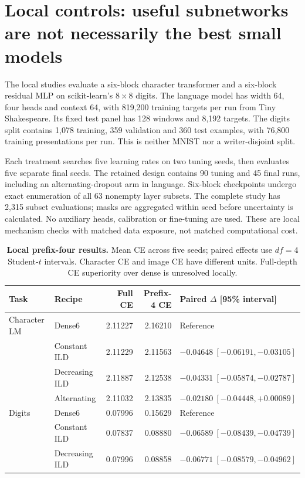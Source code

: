 \documentclass[10pt,letterpaper]{article}
\begin{document}
\clearpage
\section{Local controls: useful subnetworks are not necessarily the best small models}
The local studies evaluate a six-block character transformer and a six-block residual MLP on scikit-learn's $8\times8$ digits. The language model has width 64, four heads and context 64, with 819,200 training targets per run from Tiny Shakespeare. Its fixed test panel has 128 windows and 8,192 targets. The digits split contains 1,078 training, 359 validation and 360 test examples, with 76,800 training presentations per run. This is neither MNIST nor a writer-disjoint split.

Each treatment searches five learning rates on two tuning seeds, then evaluates five separate final seeds. The retained design contains 90 tuning and 45 final runs, including an alternating-dropout arm in language. Six-block checkpoints undergo exact enumeration of all 63 nonempty layer subsets. The complete study has 2,315 subset evaluations; masks are aggregated within seed before uncertainty is calculated. No auxiliary heads, calibration or fine-tuning are used. These are local mechanism checks with matched data exposure, not matched computational cost.

\begin{table}[h]
\centering\small\setlength{\tabcolsep}{5pt}
\caption{\textbf{Local prefix-four results.} Mean CE across five seeds; paired effects use $df=4$ Student-$t$ intervals. Character CE and image CE have different units. Full-depth CE superiority over dense is unresolved locally.}
\label{tab:local}
\begin{tabular}{@{}llrrl@{}}\toprule
Task & Recipe & Full CE & Prefix-4 CE & Paired $\Delta$ [95\% interval]\\\midrule
Character LM & Dense6 & 2.11227 & 2.16210 & Reference\\
 & Constant ILD & 2.11229 & 2.11563 & $-0.04648\ [-0.06191,-0.03105]$\\
 & Decreasing ILD & 2.11887 & 2.12538 & $-0.04331\ [-0.05874,-0.02787]$\\
 & Alternating & 2.11032 & 2.13835 & $-0.02180\ [-0.04448,+0.00089]$\\\addlinespace
Digits & Dense6 & 0.07996 & 0.15629 & Reference\\
 & Constant ILD & 0.07837 & 0.08880 & $-0.06589\ [-0.08439,-0.04739]$\\
 & Decreasing ILD & 0.07996 & 0.08858 & $-0.06771\ [-0.08579,-0.04962]$\\\bottomrule
\end{tabular}
\end{table}
\end{document}
